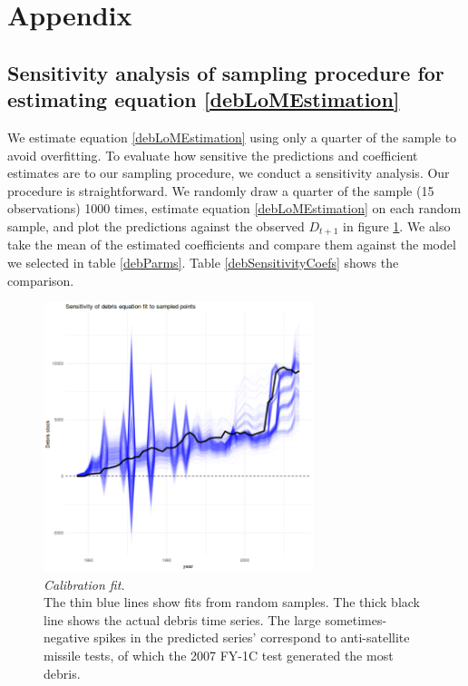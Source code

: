 \documentclass[12pt]{article}
\begin{document}
\newpage

{
	\setlength{\bibsep}{3pt}
	
	
}

\newpage
\section{Appendix}

\subsection{Sensitivity analysis of sampling procedure for estimating equation \ref{debLoMEstimation}}

We estimate equation \ref{debLoMEstimation} using only a quarter of the sample to avoid overfitting. To evaluate how sensitive the predictions and coefficient estimates are to our sampling procedure, we conduct a sensitivity analysis. Our procedure is straightforward. We randomly draw a quarter of the sample (15 observations) 1000 times, estimate equation \ref{debLoMEstimation} on each random sample, and plot the predictions against the observed $D_{t+1}$ in figure \ref{debSensitivityFig}. We also take the mean of the estimated coefficients and compare them against the model we selected in table \ref{debParms}. Table \ref{debSensitivityCoefs} shows the comparison.

\begin{figure}[H]
	\centering
	\includegraphics[width=0.7\textwidth]{../../images/debris_lom_sensitivity_plot.png}
	\captionsetup{format=hang}
	\caption{\textit{Calibration fit.} \\
		The thin blue lines show fits from random samples. The thick black line shows the actual debris time series. The large sometimes-negative spikes in the predicted series' correspond to anti-satellite missile tests, of which the 2007 FY-1C test generated the most debris.
	}
	\label{debSensitivityFig}
\end{figure}
\end{document}
